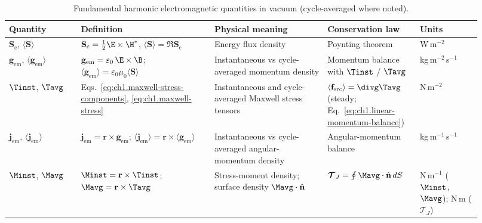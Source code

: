 \begin{table}[t]
\centering
\caption{Fundamental harmonic electromagnetic quantities in vacuum (cycle-averaged where noted).}
\label{tab:ch1.fundamental-quantities}
\small
\begin{tabular}{@{}p{0.14\linewidth}p{0.26\linewidth}p{0.22\linewidth}p{0.18\linewidth}p{0.12\linewidth}@{}}
\toprule
Quantity & Definition & Physical meaning & Conservation law & Units \\
\midrule
$\mathbf{S}_\mathrm{c}$, $\langle\mathbf{S}\rangle$
& $\mathbf{S}_\mathrm{c}=\tfrac12\E\times\H^*$, $\langle\mathbf{S}\rangle=\Re\mathbf{S}_\mathrm{c}$
& Energy flux density & Poynting theorem & W\,m$^{-2}$ \\
$\mathbf{g}_{\mathrm{em}}$, $\langle\mathbf{g}_{\mathrm{em}}\rangle$
& $\mathbf{g}_{\mathrm{em}}=\varepsilon_0\,\E\times\B$; $\langle\mathbf{g}_{\mathrm{em}}\rangle=\varepsilon_0\mu_0\langle\mathbf{S}\rangle$
& Instantaneous vs cycle-averaged momentum density
& Momentum balance with $\Tinst$ / $\Tavg$
& kg\,m$^{-2}$\,s$^{-1}$ \\
$\Tinst$, $\Tavg$
& Eqs.~\eqref{eq:ch1.maxwell-stress-components}, \eqref{eq:ch1.maxwell-stress}
& Instantaneous and cycle-averaged Maxwell stress tensors
& $\langle\mathbf{f}_{\mathrm{src}}\rangle=\divg\Tavg$ (steady; Eq.~\eqref{eq:ch1.linear-momentum-balance})
& N\,m$^{-2}$ \\
$\mathbf{j}_{\mathrm{em}}$, $\langle\mathbf{j}_{\mathrm{em}}\rangle$
& $\mathbf{j}_{\mathrm{em}}=\mathbf{r}\times\mathbf{g}_{\mathrm{em}}$; $\langle\mathbf{j}_{\mathrm{em}}\rangle=\mathbf{r}\times\langle\mathbf{g}_{\mathrm{em}}\rangle$
& Instantaneous vs cycle-averaged angular-momentum density
& Angular-momentum balance
& kg\,m$^{-1}$\,s$^{-1}$ \\
$\Minst$, $\Mavg$
& $\Minst=\mathbf{r}\times\Tinst$; $\Mavg=\mathbf{r}\times\Tavg$
& Stress-moment density; surface density $\Mavg\cdot\hat{\mathbf{n}}$
& $\boldsymbol{\mathcal{T}}_J=\oint\Mavg\cdot\hat{\mathbf{n}}\,dS$
& N\,m$^{-1}$ ($\Minst$, $\Mavg$); N\,m ($\boldsymbol{\mathcal{T}}_J$) \\
\bottomrule
\end{tabular}
\end{table}


